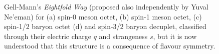\begin{figure}[htb]\begin{center}
	\caption{Gell-Mann's \textit{Eightfold Way} (proposed also independently 
          by Yuval Ne'eman) for (a) spin-0 meson octet, (b) spin-1 meson octet, 
          (c) spin-1/2 baryon octet (d) and spin-3/2 baryon decuplet, classified 
          through their electric charge $q$ and 
          strangeness $s$, %
          but it is now understood that this structure is a 
          consequence of flavour symmetry.\label{fig:eightfold}}
\end{center}\end{figure}


